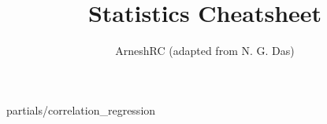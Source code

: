 \documentclass[twocolumn]{article}
\title{Statistics Cheatsheet}
\author{ArneshRC (adapted from N. G. Das)}
\date{}
\begin{document}
\maketitle




 {partials/correlation_regression}
\end{document}
